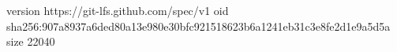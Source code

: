 version https://git-lfs.github.com/spec/v1
oid sha256:907a8937a6ded80a13e980e30bfc921518623b6a1241eb31c3e8fe2d1e9a5d5a
size 22040
